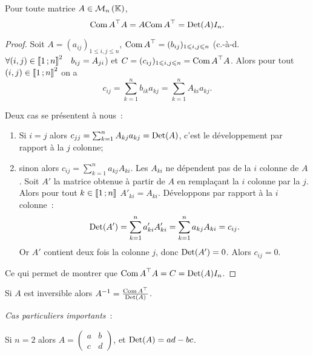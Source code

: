 \begin{prop}
  Pour toute matrice \(A \in \mathcal{M}_{n}\left(\mathbb{K}\right)\),
  \begin{equation}
    {\operatorname{Com}A}^{\top} A = A {\operatorname{Com} A}^{\top} = \operatorname{Det}(A) I_n.
  \end{equation}
\end{prop}
\begin{proof}
  Soit \(A=(a_{ij})_{1 \leqslant i,j \leqslant n}\), \({\operatorname{Com} A}^{\top} = 
  (b_{ij})_{1 \leqslant i,j \leqslant n}\) (c.-à-d. \(\forall (i,j) \in 
  \mathopen{\llbracket}1\mathclose{}\mathpunct{};n\mathclose{\rrbracket}^2 \quad b_{ij}=A_{ji}\)) et \(C=(c_{ij})_{1 
  \leqslant i,j \leqslant n}={\operatorname{Com} A}^{\top} A\). Alors pour tout \((i,j) 
  \in \mathopen{\llbracket}1\mathclose{}\mathpunct{};n\mathclose{\rrbracket}^2\) on a
  \begin{equation}
    c_{ij} = \sum_{k=1}^n b_{ik}a_{kj} = \sum_{k=1}^n A_{ki} a_{kj}.
  \end{equation}

  Deux cas se présentent à nous~:
  \begin{enumerate}
    \item Si \(i=j\) alors \(c_{jj} = \sum_{k=1}^n A_{kj} a_{kj} = 
      \operatorname{Det}(A)\), c'est le développement par rapport à la \(j\)\ieme{} 
      colonne;
    \item sinon alors \(c_{ij} = \sum_{k=1}^n a_{kj} A_{ki}\). Les 
      \(A_{ki}\) ne dépendent pas de la \(i\)\ieme{} colonne de \(A\). 
      Soit \(A'\) la matrice obtenue à partir de \(A\) en remplaçant la 
      \(i\)\ieme{} colonne par la \(j\)\ieme{}. Alors pour tout \(k \in 
      \mathopen{\llbracket}1\mathclose{}\mathpunct{};n\mathclose{\rrbracket}\) \(A'_{ki}=A_{ki}\). Développons par 
      rapport à la \(i\)\ieme{} colonne~:
      \begin{equation}
        \operatorname{Det}(A') = \sum_{k=1}^n a'_{ki} A'_{ki} = \sum_{k=1}^n a_{kj} 
        A_{ki} =c_{ij}.
      \end{equation}
      Or \(A'\) contient deux fois la colonne \(j\), donc \(\operatorname{Det}(A')=0\). 
      Alors \(c_{ij}=0\).
  \end{enumerate}

  Ce qui permet de montrer que \({\operatorname{Com} A}^{\top} A = C = \operatorname{Det}(A) I_n\).
\end{proof}
\begin{corth}
  Si \(A\) est inversible alors \(A^{-1} = \frac{{\operatorname{Com} 
  A}^{\top}}{\operatorname{Det}(A)}\).
\end{corth}

\emph{Cas particuliers importants}~:

Si \(n=2\) alors 
\(A = \begin{pmatrix}
  a & b \\
  c & d
\end{pmatrix}
\),
et \(\operatorname{Det}(A) = ad-bc\).


